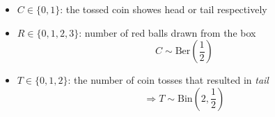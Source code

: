 \begin{itemize}
  \item{$C \in \{0,1\}$: the tossed coin showes head or tail respectively}
  \item{$R \in \{0,1,2,3\}$: number of red balls drawn from the box
\[ C \sim \mathrm{Ber}\left(\frac{1}{2}\right) \]}
  \item{$T \in \{0,1,2\}$: the number of coin tosses that resulted in \emph{tail}}
\[ \Rightarrow T \sim \mathrm{Bin}\left(2, \frac{1}{2}\right) \]
\end{itemize}

